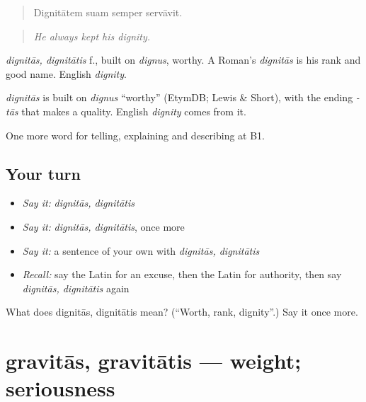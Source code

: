 \begin{quote}
Dignitātem suam semper servāvit.
\end{quote}

\begin{quote}
\emph{He always kept his dignity.}
\end{quote}

\emph{dignitās, dignitātis} f., built on \emph{dignus}, worthy. A Roman's \emph{dignitās} is his rank and good name. English \emph{dignity}.

\begin{cousinweb}
\emph{dignitās} is built on \emph{dignus} \textquotedblleft{}worthy\textquotedblright{} (EtymDB; Lewis \& Short), with the ending \emph{-tās} that makes a quality. English \emph{dignity} comes from it.
\end{cousinweb}

\begin{grammarlens}[title={What you've built}]
One more word for telling, explaining and describing at B1.
\end{grammarlens}

\subsection*{Your turn}
\begin{itemize}
\raggedright
  \item \emph{Say it:} \emph{dignitās, dignitātis}
  \item \emph{Say it:} \emph{dignitās, dignitātis}, once more
  \item \emph{Say it:} a sentence of your own with \emph{dignitās, dignitātis}
  \item \emph{Recall:} say the Latin for an excuse, then the Latin for authority, then say \emph{dignitās, dignitātis} again
\end{itemize}

\begin{tcolorbox}[breakable,colback=teal!4,colframe=teal!35!black,title={Before you move on}]
What does dignitās, dignitātis mean? (\textquotedblleft{}Worth, rank, dignity\textquotedblright{}.) Say it once more.
\end{tcolorbox}
\section[gravitās, gravitātis]{gravitās, gravitātis — weight; seriousness}

\label{lesson:LA-C370-gravitas}



